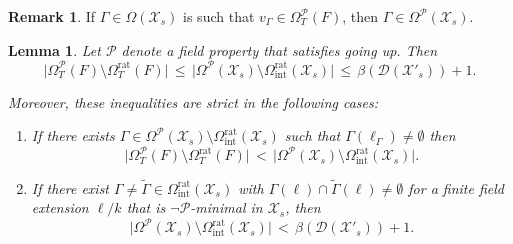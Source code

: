 \documentclass[a4paper,12pt,reqno]{amsart}
\newcommand\mc\mathcal
\newtheorem{lem}[thm]{Lemma}
\theoremstyle{definition}
\newtheorem{rem}[thm]{Remark}
\numberwithin{equation}{thm}
\renewcommand{\leq}{\leqslant}
\begin{document}
\begin{rem}  If $\Gamma \in \Omega(\mc{X}_s)$ is such that $v_\Gamma \in \Omega^{\mathcal{P}}_T(F)$, then $\Gamma \in \Omega^{\mathcal{P}}(\mc{X}_s)$.
\end{rem}




\begin{lem}\label{non-rat vorteces}
Let $\mathcal{P}$ denote a field property that satisfies going up. Then
$$ \vert \Omega^{\mathcal{P}}_T(F)  \setminus \Omega^{\mathrm{rat}}_T(F)  \vert  \, \leq  \,\vert \Omega^{\mathcal{P}}(\mc{X}_s) \setminus \Omega^\mathrm{rat}_{\mathrm{int}}(\mc{X}_s) \vert \, \leq \, \beta(\mathcal{D}(\mc{X}'_s)) + 1.$$ 

\smallskip

Moreover, these inequalities are strict in the following cases:
 \begin{enumerate}
     \item[$(i)$] If there exists $\Gamma \in \Omega^{ \mathcal{P}}(\mc{X}_s) \setminus \Omega^\mathrm{rat}_{\mathrm{int}}(\mc{X}_s)$ such that $\Gamma(\ell_{\Gamma}) \neq \emptyset$ then 
     $$ \vert \Omega^{\mathcal{P}}_T(F)  \setminus \Omega^{\mathrm{rat}}_T(F)  \vert  \, <  \,\vert \Omega^{ \mathcal{P}}(\mc{X}_s) \setminus \Omega^\mathrm{rat}_{\mathrm{int}}(\mc{X}_s) \vert.$$
     \item[$(ii)$] If there exist $\Gamma \neq \widetilde{\Gamma} \in \Omega^{\mathrm{rat}}_{\mathrm{int}}(\mc{X}_s)$ with
     $\Gamma(\ell) \cap \widetilde{\Gamma}(\ell) \neq \emptyset$  for a finite field extension $\ell/k$ that is $\neg\mathcal{P}$-minimal in $\mc{X}_s$, then 
    $$\vert \Omega^{\mathcal{P}}(\mc{X}_s) \setminus \Omega^\mathrm{rat}_{\mathrm{int}}(\mc{X}_s) \vert \, < \, \beta(\mathcal{D}(\mc{X}'_s)) + 1.$$
 \end{enumerate}
\end{lem}
\end{document}
